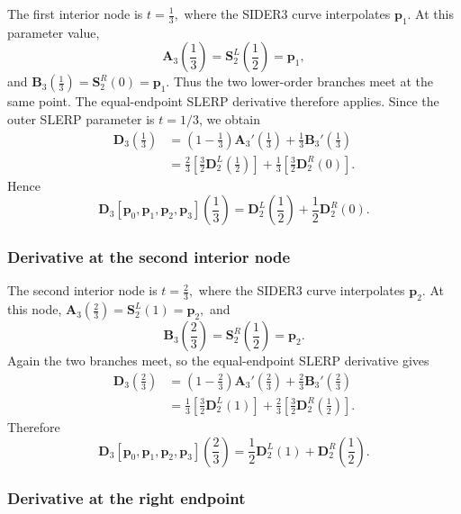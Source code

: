 \documentclass[a4paper,11pt]{article}
\newcommand{\bp}{\mathbf{p}}
\newcommand{\bA}{\mathbf{A}}
\newcommand{\bB}{\mathbf{B}}
\newcommand{\bD}{\mathbf{D}}
\numberwithin{equation}{section}
\theoremstyle{plain}
\theoremstyle{definition}
\theoremstyle{remark}
\begin{document}
The first interior node is
\(t=\frac13,\)
where the SIDER3 curve interpolates $\bp_1$.  At this parameter value,
\[
        \bA_3\!\left(\frac13\right)
        =
        \mathbf{S}_2^L\!\left(\frac12\right)
        =
        \bp_1,
\]
and
\(\bB_3\!\left(\frac13\right) = \mathbf{S}_2^R(0) = \bp_1.\)
Thus the two lower-order branches meet at the same point.  The equal-endpoint SLERP derivative therefore applies.  Since the outer SLERP parameter is $t=1/3$, we obtain
\[
\begin{aligned}
        \bD_3\!\left(\frac13\right)
        &=
        \left(1-\frac13\right)\bA_3'\!\left(\frac13\right)
        +
        \frac13 \bB_3'\!\left(\frac13\right)
        \\
        &=
        \frac23
        \left[
        \frac32\bD_2^L\!\left(\frac12\right)
        \right]
        +
        \frac13
        \left[
        \frac32\bD_2^R(0)
        \right].
\end{aligned}
\]
Hence
\[
\boxed{
        \bD_3[\bp_0,\bp_1,\bp_2,\bp_3]\!\left(\frac13\right)
        =
        \bD_2^L\!\left(\frac12\right)
        +
        \frac12\bD_2^R(0).
}
\]

\subsubsection{Derivative at the second interior node}

The second interior node is
\(t=\frac23,\)
where the SIDER3 curve interpolates $\bp_2$.  At this node,
\(\bA_3\!\left(\frac23\right) = \mathbf{S}_2^L(1) = \bp_2,\)
and
\[
        \bB_3\!\left(\frac23\right)
        =
        \mathbf{S}_2^R\!\left(\frac12\right)
        =
        \bp_2.
\]
Again the two branches meet, so the equal-endpoint SLERP derivative gives
\[
\begin{aligned}
        \bD_3\!\left(\frac23\right)
        &=
        \left(1-\frac23\right)\bA_3'\!\left(\frac23\right)
        +
        \frac23 \bB_3'\!\left(\frac23\right)
        \\
        &=
        \frac13
        \left[
        \frac32\bD_2^L(1)
        \right]
        +
        \frac23
        \left[
        \frac32\bD_2^R\!\left(\frac12\right)
        \right].
\end{aligned}
\]
Therefore
\[
\boxed{
        \bD_3[\bp_0,\bp_1,\bp_2,\bp_3]\!\left(\frac23\right)
        =
        \frac12\bD_2^L(1)
        +
        \bD_2^R\!\left(\frac12\right).
}
\]

\subsubsection{Derivative at the right endpoint}
\end{document}
